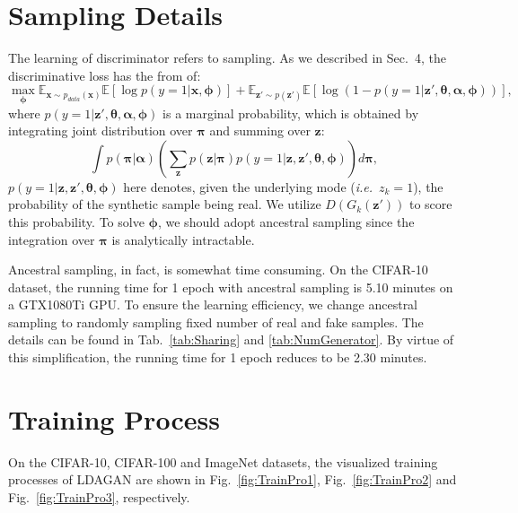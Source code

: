 \documentclass{article}
\def\ie{\emph{i.e.}}
\begin{document}
\section{Sampling Details}
\label{App:Sampling}
The learning of discriminator refers to sampling.
As we described in Sec.~4, the discriminative loss has the from of:
\begin{equation}
\label{eq:Learning-D}
\max_{\bm{\phi}}
\mathbb{E}_{\mathbf{x} \sim p_{data}\left(\mathbf{x}\right)}
\mathbb{E}\left[ \log p\left( y=1 | \mathbf{x},\bm{\phi} \right) \right]
+\mathbb{E}_{\mathbf{z}' \sim p\left(\mathbf{z}'\right)}
\mathbb{E}\left[ \log\left( 1-p\left( y=1 | \mathbf{z}',\bm{\theta},\bm{\alpha},\bm{\phi} \right) \right) \right],
\end{equation}
where $p\left( y=1 | \mathbf{z}',\bm{\theta},\bm{\alpha},\bm{\phi} \right)$ is a marginal probability, which is obtained by integrating joint distribution over $\bm{\pi}$ and summing over $\mathbf{z}$:
\begin{equation}
\int p\left(\bm{\pi} | \bm{\alpha}\right)
\left(\sum_{\mathbf{z}}
p\left(\mathbf{z}|\bm{\pi}\right)
p\left(y=1|\mathbf{z}, \mathbf{z}', \bm{\theta}, \bm{\phi}\right)
\right)d\bm{\pi},
\label{eq:Learning-D2}
\end{equation}
$p\left(y=1|\mathbf{z}, \mathbf{z}', \bm{\theta}, \bm{\phi}\right)$ here denotes, given the underlying mode (\ie~$z_k=1$), the probability of the synthetic sample being real.
We utilize $ D\left(G_k\left(\mathbf{z}'\right)\right)$ to score this probability.
To solve $\bm{\phi}$, we should adopt ancestral sampling since the integration over $\bm{\pi}$ is analytically intractable.

Ancestral sampling, in fact, is somewhat time consuming.
On the CIFAR-10 dataset, the running time for 1 epoch with ancestral sampling is 5.10 minutes on a GTX1080Ti GPU.
To ensure the learning efficiency, we change ancestral sampling to randomly sampling fixed number of real and fake samples.
The details can be found in Tab.~\ref{tab:Sharing} and \ref{tab:NumGenerator}.
By virtue of this simplification, the running time for 1 epoch reduces to be 2.30 minutes.



\section{Training Process}
\label{App:TrainingPro}

On the CIFAR-10, CIFAR-100 and ImageNet datasets, the visualized training processes of LDAGAN are shown in Fig.~\ref{fig:TrainPro1}, Fig.~\ref{fig:TrainPro2} and Fig.~\ref{fig:TrainPro3}, respectively.
\end{document}
